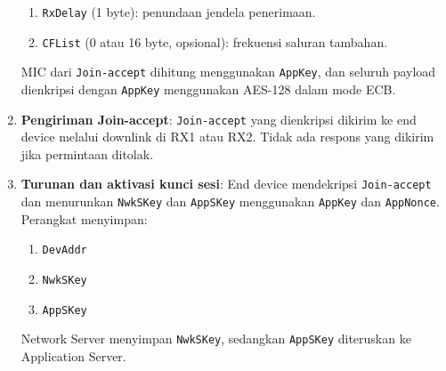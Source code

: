 \begin{enumerate}
\begin{enumerate}
              \item \texttt{RxDelay} (1 byte): penundaan jendela penerimaan.
              \item \texttt{CFList} (0 atau 16 byte, opsional): frekuensi saluran tambahan.
          \end{enumerate}
          MIC dari \texttt{Join-accept} dihitung menggunakan \texttt{AppKey}, dan seluruh payload dienkripsi dengan \texttt{AppKey} menggunakan AES-128 dalam mode ECB.
    \item \textbf{Pengiriman Join-accept}: \texttt{Join-accept} yang dienkripsi dikirim ke end device melalui downlink di RX1 atau RX2. Tidak ada respons yang dikirim jika permintaan ditolak.
    \item \textbf{Turunan dan aktivasi kunci sesi}: End device mendekripsi \texttt{Join-accept} dan menurunkan \texttt{NwkSKey} dan \texttt{AppSKey} menggunakan \texttt{AppKey} dan \texttt{AppNonce}. Perangkat menyimpan:
          \begin{enumerate}
              \item \texttt{DevAddr}
              \item \texttt{NwkSKey}
              \item \texttt{AppSKey}
          \end{enumerate}
          Network Server menyimpan \texttt{NwkSKey}, sedangkan \texttt{AppSKey} diteruskan ke Application Server.
\end{enumerate}

